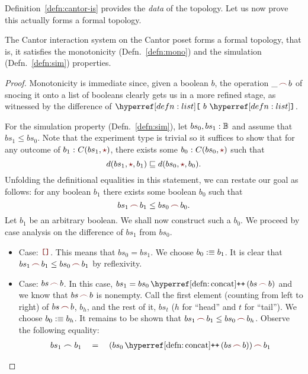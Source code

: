 Definition~\ref{defn:cantor-is} provides the \emph{data} of the topology. Let us now prove
this actually forms a formal topology.
\begin{thm}\label{thm:cantor-topo}
  The Cantor interaction system on the Cantor poset forms a formal topology, that is, it
  satisfies the monotonicity (Defn.~\ref{defn:mono}) and the simulation
  (Defn.~\ref{defn:sim}) properties.
\end{thm}
\begin{proof}
  Monotonicity is immediate since, given a boolean $b$, the operation $\snoc{\_}{b}$ of
  snocing it onto a list of booleans clearly gets us in a more refined stage, as witnessed
  by the difference of $\singleton{b}$.

  For the simulation property (Defn.~\ref{defn:sim}), let
  $bs_0, bs_1:\mathbb{B}{}$ and assume that $bs_1 \le bs_0$. Note that the
  experiment type is trivial so it suffices to show that for any outcome of
  $\oftyI{b_1}{C(bs_1, \unittm{})}$, there exists some $\oftyI{b_0}{C(bs_0, \unittm{})}$
  such that
  \begin{equation*}
    d(bs_1, \unittm{}, b_1) \sqsubseteq d(bs_0, \unittm{}, b_0).
  \end{equation*}
  Unfolding the definitional equalities in this statement, we can restate our goal as
  follows: for any boolean $b_1$ there exists some boolean $b_0$ such that
  \begin{equation*}
    \snoc{bs_1}{b_1} \le \snoc{bs_0}{b_0}.
  \end{equation*}
  Let $b_1$ be an arbitrary boolean. We shall now construct such a $b_0$. We proceed by
  case analysis on the difference of $bs_1$ from $bs_0$.
  \begin{itemize}
    \item Case: $\emptylist{}$. This means that $bs_0 = bs_1$. We choose $b_0 :\equiv b_1$. It
      is clear that $\snoc{bs_1}{b_1} \le \snoc{bs_0}{b_1}$ by reflexivity.
    \item Case: $\snoc{bs}{b}$. In this case, $bs_1 = bs_0 \concat{} (\snoc{bs}{b})$ and
      we know that $\snoc{bs}{b}$ is nonempty. Call the first element (counting from left
      to right) of $\snoc{bs}{b}$, $b_h$, and the rest of it, $bs_t$ ($h$ for ``head'' and
      $t$ for ``tail''). We choose $b_0 :\equiv b_h$. It remains to be shown that
      $\snoc{bs_1}{b_1} \le \snoc{bs_0}{b_h}$.
      Observe the following equality:
      \begin{align*}
        bs_1 \frown b_1 \quad&=\quad \snoc{(bs_0 \concat{} (\snoc{bs}{b}))}{b_1}                   \\

\end{align*}
\end{itemize}
\end{proof}
